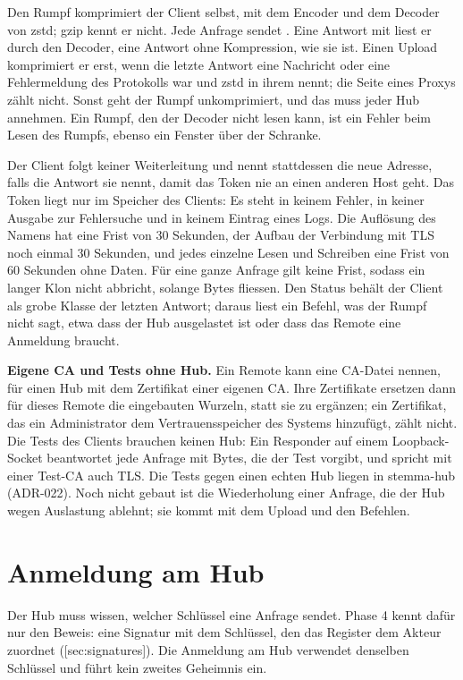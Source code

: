 Den Rumpf komprimiert der Client selbst, mit dem Encoder und dem Decoder von zstd; gzip
kennt er nicht.
Jede Anfrage sendet .
Eine Antwort mit  liest er durch den Decoder, eine Antwort ohne
Kompression, wie sie ist.
Einen Upload komprimiert er erst, wenn die letzte Antwort eine Nachricht oder eine
Fehlermeldung des Protokolls war und zstd in ihrem  nennt;
die Seite eines Proxys zählt nicht.
Sonst geht der Rumpf unkomprimiert, und das muss jeder Hub annehmen.
Ein Rumpf, den der Decoder nicht lesen kann, ist ein Fehler beim Lesen des Rumpfs, ebenso ein
Fenster über der Schranke.

Der Client folgt keiner Weiterleitung und nennt stattdessen die neue Adresse, falls die Antwort
sie nennt, damit das Token nie an einen anderen Host geht.
Das Token liegt nur im Speicher des Clients: Es steht in keinem Fehler, in keiner Ausgabe zur
Fehlersuche und in keinem Eintrag eines Logs.
Die Auflösung des Namens hat eine Frist von 30 Sekunden, der Aufbau der Verbindung mit TLS noch
einmal 30 Sekunden, und jedes einzelne Lesen und Schreiben eine Frist von 60 Sekunden ohne Daten.
Für eine ganze Anfrage gilt keine Frist, sodass ein langer Klon nicht abbricht, solange Bytes
fliessen.
Den Status behält der Client als grobe Klasse der letzten Antwort; daraus liest ein Befehl, was
der Rumpf nicht sagt, etwa dass der Hub ausgelastet ist oder dass das Remote eine Anmeldung
braucht.

\startinfobox
{\bf Eigene CA und Tests ohne Hub.}
Ein Remote kann eine CA-Datei nennen, für einen Hub mit dem Zertifikat einer eigenen CA.
Ihre Zertifikate ersetzen dann für dieses Remote die eingebauten Wurzeln, statt sie zu ergänzen;
ein Zertifikat, das ein Administrator dem Vertrauensspeicher des Systems hinzufügt, zählt nicht.
Die Tests des Clients brauchen keinen Hub: Ein Responder auf einem Loopback-Socket beantwortet jede
Anfrage mit Bytes, die der Test vorgibt, und spricht mit einer Test-CA auch TLS.
Die Tests gegen einen echten Hub liegen in stemma-hub (ADR-022).
Noch nicht gebaut ist die Wiederholung einer Anfrage, die der Hub wegen Auslastung ablehnt;
sie kommt mit dem Upload und den Befehlen.
\stopinfobox

\section[sec:hub-auth]{Anmeldung am Hub}

Der Hub muss wissen, welcher Schlüssel eine Anfrage sendet.
Phase 4 kennt dafür nur den Beweis: eine Signatur mit dem Schlüssel, den das Register dem Akteur
zuordnet ([sec:signatures]).
Die Anmeldung am Hub verwendet denselben Schlüssel und führt kein zweites Geheimnis ein.

